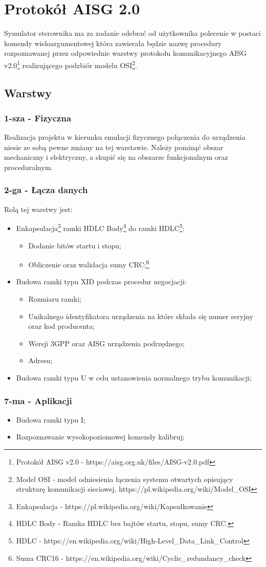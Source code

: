 \chapter{Protokół AISG 2.0}
	Symulator sterownika ma za zadanie odebrać od użytkownika polecenie w postaci komendy wieloargumentowej która zawierała będzie nazwę procedury rozpoznawanej przez odpowiednie warstwy protokołu komunikacyjnego AISG v2.0\footnote{\label{AISG} Protokół AISG v2.0 - https://aisg.org.uk/files/AISG-v2.0.pdf} realizującego podzbiór modelu OSI\footnote{\label{Model OSI} Model OSI - model odniesienia łączenia systemu otwartych opisujący strukturę komunikacji sieciowej, https://pl.wikipedia.org/wiki/Model\_OSI}.
	\section{Warstwy}
		\subsection{1-sza - Fizyczna}
		Realizacja projektu w kierunku emulacji fizycznego połączenia do urządzenia niesie ze sobą pewne zmiany na tej warstawie.\newline
		Należy pominąć obszar mechaniczny i elektryczny, a skupić się na obszarze funkcjonalnym oraz proceduralnym.
		\subsection{2-ga - Łącza danych}
		Rolą tej warstwy jest:
		\begin{itemize}
			\item Enkapsulacja\footnote{\label{Enkapsulacja} Enkapsulacja - https://pl.wikipedia.org/wiki/Kapsułkowanie} ramki HDLC Body\footnote{\label{HDLC Body} HDLC Body - Ramka HDLC bez bajtów startu, stopu, sumy CRC.} do ramki HDLC\footnote{\label{DUPA} HDLC - https://en.wikipedia.org/wiki/High-Level\_Data\_Link\_Control}:
			\begin{itemize}
				\item Dodanie bitów startu i stopu;
				\item Obliczenie oraz walidacja sumy CRC;\footnote{\label{CRC} Suma CRC16 - https://en.wikipedia.org/wiki/Cyclic\_redundancy\_check}
			\end{itemize}
			\item Budowa ramki typu XID podczas procedur negocjacji:
			\begin{itemize}
				\item Rozmiaru ramki;
				\item Unikalnego identyfikatora urządzenia na które składa się numer seryjny oraz kod producenta;
				\item Wersji 3GPP oraz AISG urządzenia podrzędnego;
				\item Adresu;
			\end{itemize}
			\item Budowa ramki typu U w celu ustanowienia normalnego trybu komunikacji;
		\end{itemize}
		\subsection{7-ma - Aplikacji}
			\begin{itemize}
				\item Budowa ramki typu I;
				\item Rozpoznawanie wysokopoziomowej komendy kalibruj;
			\end{itemize}